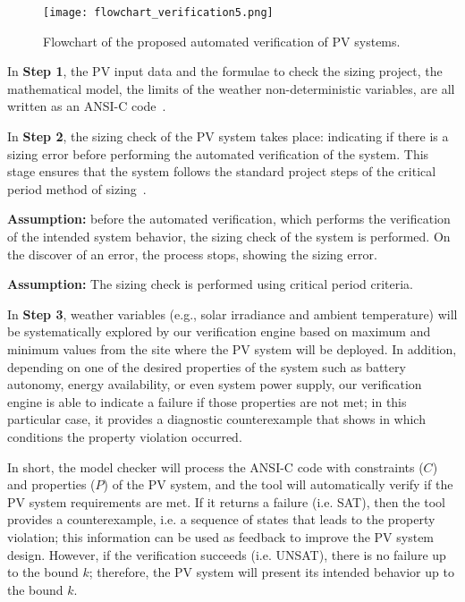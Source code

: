\begin{figure}[h]
\texttt{[image: flowchart\_verification5.png]}
\centering
\caption{Flowchart of the proposed automated verification of PV systems.}
\label{fig:flowchartgeneral}
\end{figure}

In \textbf{Step 1}, the PV input data %
and the formulae to check the sizing project, the mathematical model, the limits of the weather non-deterministic variables, are all written as an ANSI-C code~\cite{ANSI2018}. 

In \textbf{Step 2}, the sizing check of the PV system takes place: indicating if there is a sizing error before performing the automated verification of the system. This stage ensures that the system follows the standard project steps of the critical period method of sizing~\cite{Pinho}. 

\textbf{Assumption:} before the automated verification, which performs the verification of the intended system behavior, the sizing check of the system is performed. On the discover of an error, the process stops, showing the sizing error.

\textbf{Assumption:} The sizing check is performed using critical period criteria.

In \textbf{Step 3}, weather variables (e.g., solar irradiance and ambient temperature) will be systematically explored by our verification engine based on maximum and minimum values from the site where the PV system will be deployed. 
In addition, depending on one of the desired properties of the system such as battery autonomy, energy availability, or even system power supply, our verification engine is able to indicate a failure if those properties are not met; in this particular case, it provides a diagnostic counterexample that shows in which conditions the property violation occurred. 

%
In short, the model checker will process the ANSI-C code with constraints ($C$) and properties ($P$) of the PV system, and the tool will automatically verify if the PV system requirements are met. If it returns a failure (i.e. SAT), then the tool provides a counterexample, i.e. a sequence of states that leads to the property violation; this information can be used as feedback to improve the PV system design. However, if the verification succeeds (i.e. UNSAT), there is no failure up to the bound $k$; therefore, the PV system will present its intended behavior up to the bound $k$.

